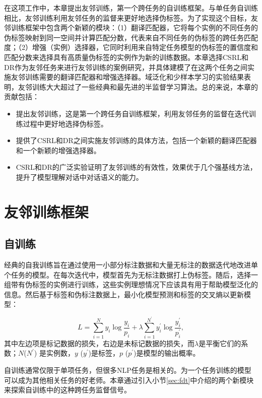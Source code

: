 在这项工作中，本章提出友邻训练，第一个跨任务的⾃训练框架。与单任务⾃训练相比，友邻训练利用友邻任务的监督来更好地选择伪标签。为了实现这个目标，友邻训练框架中包含两个新颖的模块：（1）翻译匹配器，它将每个实例的不同任务的伪标签映射到同⼀空间并计算匹配分数，代表来⾃不同任务的伪标签的跨任务匹配度；（2）增强（实例）选择器，它同时利⽤来自特定任务模型的伪标签的置信度和匹配分数来选择具有⾼质量伪标签的实例作为新的训练数据。本章选择CSRL和DR作为友邻任务来进⾏友邻训练的案例研究，并具体建模了在这两个任务之间实施友邻训练需要的翻译匹配器和增强选择器。域泛化和少样本学习的实验结果表明，友邻训练⼤⼤超过了一些经典和最先进的半监督学习算法。总的来说，本章的贡献包括：

\begin{itemize}
    \item 提出友邻训练，这是第一个跨任务⾃训练框架，利用友邻任务的监督在迭代训练过程中更好地选择伪标签。
    \item 提供了CSRL和DR之间实施友邻训练的具体方法，包括⼀个新颖的翻译匹配器和⼀个新颖的增强选择器。
    \item CSRL和DR的⼴泛实验证明了友邻训练的有效性，效果优于⼏个强基线方法，提升了模型理解对话中对话语义的能力。
\end{itemize}


\section{友邻训练框架}\label{sec:fdt_framework}

\subsection{自训练}
经典的⾃我训练旨在通过使⽤一小部分标注数据和⼤量无标注的数据迭代地改进单个任务的模型。在每次迭代中，模型⾸先为无标注数据打上伪标签。随后，选择一组带有伪标签的实例进行训练，这些实例理想情况下应该具有用于帮助模型泛化的信息。然后基于标签和伪标注数据上，最小化模型预测和标签的交叉熵以更新模型：

\begin{equation}\label{eq:loss}
    L = \sum_{i=1}^{N}y_{i}\log\frac{y_{i}}{p_{i}} + \lambda\sum_{i=1}^{N^{\prime}}y_{i}^{\prime}\log\frac{y_{i}^{\prime}}{p_{i}^{\prime}},
\end{equation}
其中左边项是标记数据的损失，右边是未标记数据的损失，⽽$\lambda$是平衡它们的系数；$N$($N^{\prime}$) 是实例数，$y$ ($y^{\prime}$)是标签，$p$ ($p^{\prime}$)是模型的输出概率。

⾃训练通常仅限于单项任务，但很多NLP任务是相关的。为一个任务训练的模型可以成为其他相关任务的好⽼师。本章通过引入⼩节\ref{sec:fdt}中介绍的两个新模块来探索自训练中的这种跨任务监督信号。


